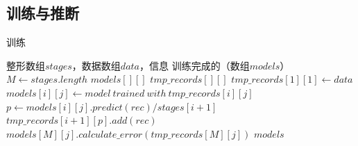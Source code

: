 
\subsection{{\rmi}训练与推断}
\label{sec:rmi-train-inference}

\begin{algorithm}
\caption{{\rmi}训练}
\label{algo:rmi-train}
\begin{algorithmic}[1] %
\Require 整形数组$stages$，数据数组$data$，{\model}信息 %
\Ensure 训练完成的{\rmi}（{\model}数组$models$） %
\State $M \gets stages.length$
\label{rmi-train:line:stage-length}
\State $models[][]$
\label{rmi-train:line:init-models}
\State $tmp\_records[][]$
\label{rmi-train:line:init-data}
\State $tmp\_records[1][1] \gets data$
\label{rmi-train:line:init-data-root}
  \label{rmi-train:line:stage-begin}
    \State $models[i][j] \gets model~trained~with~tmp\_records[i][j]$
    \label{rmi-train:line:train-model}
    \label{rmi-train:line:assign-precond}
      \label{rmi-train:line:assign-begin}
        \State $p \gets models[i][j].predict(rec) / stages[i+1]$
        \State $tmp\_records[i+1][p].add(rec)$
      \EndFor
      \label{rmi-train:line:assign-end}
    \EndIf
  \EndFor
  \label{rmi-train:line:stage-end}
\EndFor
{}
\label{rmi-train:line:error-begin}
  \State $models[M][j].calculate\_error(tmp\_records[M][j])$
\EndFor
\label{rmi-train:line:error-end}
\State \Return $models$
\label{rmi-train:line:return}
\end{algorithmic}
\end{algorithm}

